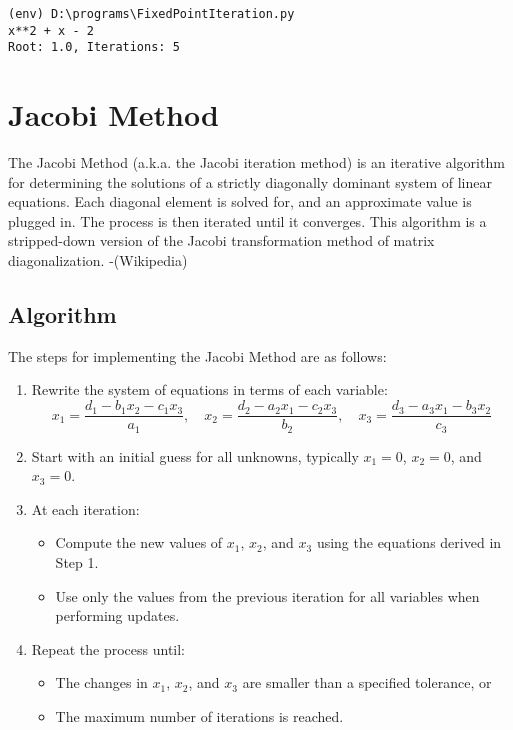 \documentclass[12pt]{article}
\begin{document}
        {\small
        \begin{verbatim}
(env) D:\programs\FixedPointIteration.py
x**2 + x - 2
Root: 1.0, Iterations: 5
        \end{verbatim}
        }
    
        \newpage
        \section*{Jacobi Method}


        The Jacobi Method (a.k.a. the Jacobi iteration method) is an iterative algorithm for determining the solutions of a strictly diagonally dominant system of linear equations. Each diagonal element is solved for, and an approximate value is plugged in. The process is then iterated until it converges. This algorithm is a stripped-down version of the Jacobi transformation method of matrix diagonalization. -(Wikipedia)

        \subsection*{Algorithm}
        The steps for implementing the Jacobi Method are as follows:

        \begin{enumerate}
            \item Rewrite the system of equations in terms of each variable:
            \[
            x_1 = \frac{d_1 - b_1x_2 - c_1x_3}{a_1}, \quad
            x_2 = \frac{d_2 - a_2x_1 - c_2x_3}{b_2}, \quad
            x_3 = \frac{d_3 - a_3x_1 - b_3x_2}{c_3}
            \]

            \item Start with an initial guess for all unknowns, typically \(x_1 = 0\), \(x_2 = 0\), and \(x_3 = 0\).

            \item At each iteration:
            \begin{itemize}
                \item Compute the new values of \(x_1\), \(x_2\), and \(x_3\) using the equations derived in Step 1.
                \item Use only the values from the previous iteration for all variables when performing updates.
            \end{itemize}

            \item Repeat the process until:
            \begin{itemize}
                \item The changes in \(x_1\), \(x_2\), and \(x_3\) are smaller than a specified tolerance, or
                \item The maximum number of iterations is reached.
            \end{itemize}
        \end{enumerate}
\end{document}
